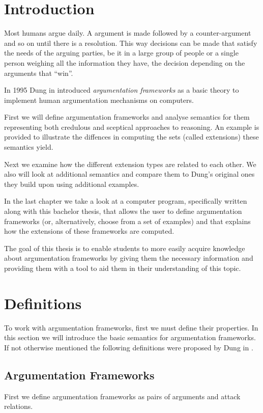 \documentclass[draft,final]{vutinfth} %
\newcommand{\hl}{\par\vspace{6pt}} %
\newcommand{\cl}{\par\vspace{12pt}} %
\begin{document}
\chapter{Introduction}
Most humans argue daily. A argument is made followed by a counter-argument and so on until there is a resolution. This way decisions can be made that satisfy the needs of the arguing parties, be it in a large group of people or a single person weighing all the information they have, the decision depending on the arguments that ``win''.\hl
In 1995 Dung in \cite{Dung} introduced \emph{argumentation frameworks} as a basic theory to implement human argumentation mechanisms on computers.\cl
First we will define argumentation frameworks and analyse semantics for them representing both credulous and sceptical approaches to reasoning. An example is provided to illustrate the diffences in computing the sets (called extensions) these semantics yield.\hl
Next we examine how the different extension types are related to each other. We also will look at additional semantics and compare them to Dung's original ones they build upon using additional examples.\hl
In the last chapter we take a look at a computer program, specifically written along with this bachelor thesis, that allows the user to define argumentation frameworks (or, alternatively, choose from a set of examples) and that explains how the extensions of these frameworks are computed.\cl %
The goal of this thesis is to enable students to more easily acquire knowledge about argumentation frameworks by giving them the necessary information and providing them with a tool to aid them in their understanding of this topic.

\chapter{Definitions}

To work with argumentation frameworks, first we must define their properties. In this section we will introduce the basic semantics for argumentation frameworks. If not otherwise mentioned the following definitions were proposed by Dung in \cite{Dung}.\cl

\section{Argumentation Frameworks}

First we define argumentation frameworks as pairs of arguments and attack relations.\hl
\end{document}
